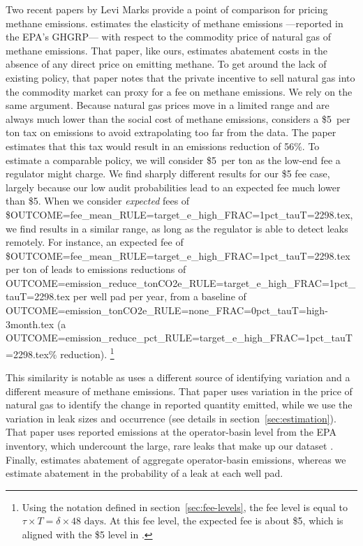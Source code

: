 \documentclass[12pt,oneside,letterpaper]{article}
\theoremstyle{definition}
\begin{document}
\begin{refsection}
Two recent papers by Levi Marks provide a point of comparison for pricing methane emissions.
\textcite{Marks:2021} estimates the elasticity of methane emissions%
---reported in the \gls{EPA}'s \gls{GHGRP}---%
with respect to  the commodity price of natural gas of methane emissions.
That paper, like ours, estimates abatement costs in the absence of any direct price on emitting methane.
To get around the lack of existing policy, that paper notes that the private incentive to sell natural gas into the commodity market can proxy for a fee on methane emissions.
We rely on the same argument.
Because natural gas prices move in a limited range and are always much lower than the social cost of methane emissions, \textcite{Marks:2021} considers a \$5~per ton  tax on emissions to avoid extrapolating too far from the data.
The paper estimates that this tax would result in an emissions reduction of 56\%.
To estimate a comparable policy, we will consider \$5~per ton  as the low-end fee a regulator might charge.
We find sharply different results for our \$5 fee case, largely because our low audit probabilities lead to an expected fee much lower than \$5.
When we consider \emph{expected} fees of
\${OUTCOME=fee_mean_RULE=target_e_high_FRAC=1pct_tauT=2298.tex},
we find results in a similar range, as long as the regulator is able to detect leaks remotely.
For instance, an expected fee of
\${OUTCOME=fee_mean_RULE=target_e_high_FRAC=1pct_tauT=2298.tex}
per ton of 
leads to emissions reductions of
{OUTCOME=emission_reduce_tonCO2e_RULE=target_e_high_FRAC=1pct_tauT=2298.tex}
 per well pad per year, from a baseline of
{OUTCOME=emission_tonCO2e_RULE=none_FRAC=0pct_tauT=high-3month.tex}
(a {OUTCOME=emission_reduce_pct_RULE=target_e_high_FRAC=1pct_tauT=2298.tex}\%
reduction).%
\footnote{%
Using the notation defined in section~\ref{sec:fee-levels}, the fee level is equal to \(\tau \times T = \delta \times \text{48 days}\).
At this fee level, the expected fee is about \$5, which is aligned with the \$5 level in \textcite{Marks:2021}.
}

This similarity is notable as \textcite{Marks:2021} uses a different source of identifying variation and a different measure of methane emissions.
That paper uses variation in the price of natural gas to identify the change in reported quantity emitted, while we  use the variation in leak sizes and occurrence
(see details in section~\ref{sec:estimation}).
That paper uses reported emissions at the operator-basin level from the \gls{EPA} inventory, which undercount the large, rare leaks that make up our dataset \parencite{Robertson/etal:2020}.
Finally, \textcite{Marks:2021} estimates abatement of aggregate operator-basin emissions, whereas we estimate abatement in the probability of a leak at each well pad.


\end{refsection}
\end{document}
